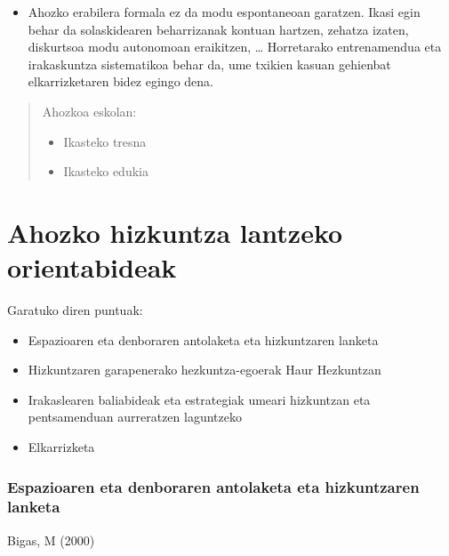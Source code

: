 \documentclass[
]{book}
\providecommand{\tightlist}{%
  \setlength{\itemsep}{0pt}\setlength{\parskip}{0pt}}
\begin{document}
\begin{itemize}
  \begin{itemize}
  \tightlist
  \item
    Ahozko erabilera formala ez da modu espontaneoan garatzen. Ikasi egin behar da solaskidearen beharrizanak kontuan hartzen, zehatza izaten, diskurtsoa modu autonomoan eraikitzen, \ldots{} Horretarako entrenamendua eta irakaskuntza sistematikoa behar da, ume txikien kasuan gehienbat elkarrizketaren bidez egingo dena.
  \end{itemize}
\end{itemize}

\begin{quote}
Ahozkoa eskolan:

\begin{itemize}
\tightlist
\item
  Ikasteko tresna
\item
  Ikasteko edukia
\end{itemize}
\end{quote}

\hypertarget{ahozko-hizkuntza-lantzeko-orientabideak}{%
\section{Ahozko hizkuntza lantzeko orientabideak}\label{ahozko-hizkuntza-lantzeko-orientabideak}}

Garatuko diren puntuak:

\begin{itemize}
\tightlist
\item
  Espazioaren eta denboraren antolaketa eta hizkuntzaren lanketa
\item
  Hizkuntzaren garapenerako hezkuntza-egoerak Haur Hezkuntzan
\item
  Irakaslearen baliabideak eta estrategiak umeari hizkuntzan eta pentsamenduan aurreratzen laguntzeko
\item
  Elkarrizketa
\end{itemize}

\hypertarget{espazioaren-eta-denboraren-antolaketa-eta-hizkuntzaren-lanketa}{%
\subsubsection{Espazioaren eta denboraren antolaketa eta hizkuntzaren lanketa}\label{espazioaren-eta-denboraren-antolaketa-eta-hizkuntzaren-lanketa}}

Bigas, M (2000)
\end{document}
